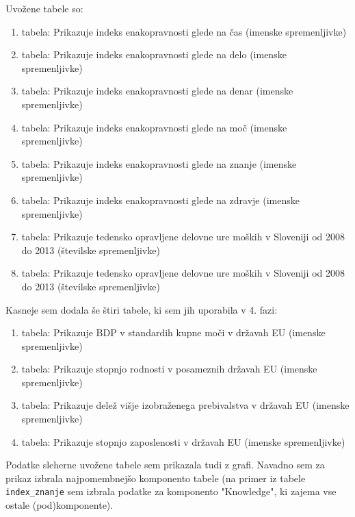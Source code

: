 \documentclass[11pt,a4paper]{article}
\begin{document}
Uvožene tabele so:
\begin{enumerate}
\item{tabela: Prikazuje indeks enakopravnosti glede na čas (imenske spremenljivke)}\\
\item{tabela: Prikazuje indeks enakopravnosti glede na delo (imenske spremenljivke)}\\
\item{tabela: Prikazuje indeks enakopravnosti glede na denar (imenske spremenljivke)}\\
\item{tabela: Prikazuje indeks enakopravnosti glede na moč (imenske spremenljivke)}\\
\item{tabela: Prikazuje indeks enakopravnosti glede na znanje (imenske spremenljivke)}\\
\item{tabela: Prikazuje indeks enakopravnosti glede na zdravje (imenske spremenljivke)}\\
\item{tabela: Prikazuje tedensko opravljene delovne ure moških v Sloveniji od 2008 do 2013 (številske spremenljivke)}\\
\item{tabela: Prikazuje tedensko opravljene delovne ure moških v Sloveniji od 2008 do 2013 (številske spremenljivke)}\\
\end{enumerate}

Kasneje sem dodala še štiri tabele, ki sem jih uporabila v 4. fazi:\\
\begin{enumerate}
\item{tabela: Prikazuje BDP v standardih kupne moči v državah EU (imenske spremenljivke)}\\
\item{tabela: Prikazuje stopnjo rodnosti v posameznih državah EU (imenske spremenljivke)}\\
\item{tabela: Prikazuje delež višje izobraženega prebivalstva v državah EU (imenske spremenljivke)}\\
\item{tabela: Prikazuje stopnjo zaposlenosti v državah EU (imenske spremenljivke)}\\
\end{enumerate}

Podatke sleherne uvožene tabele sem prikazala tudi z grafi. Navadno sem za prikaz izbrala najpomembnejšo komponento tabele (na primer iz tabele \verb-index_znanje- sem izbrala podatke za komponento "Knowledge", ki zajema vse ostale (pod)komponente). 
\end{document}
